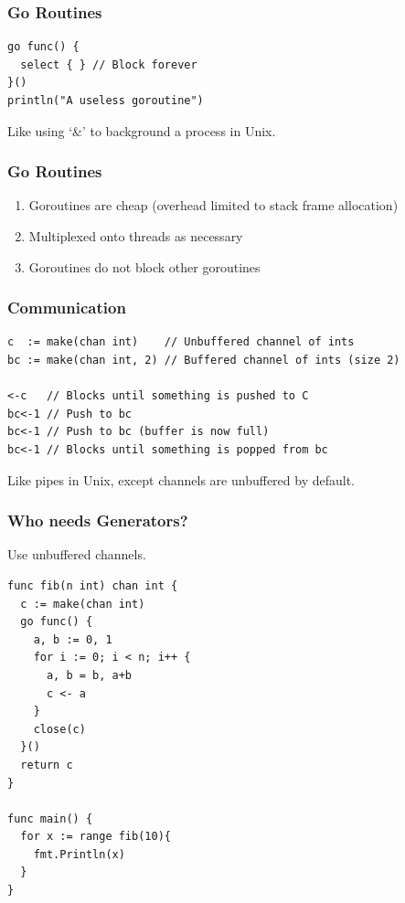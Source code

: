 \documentclass[xelatex,aspectratio=169]{beamer}
\begin{document}
\begin{frame}[fragile]
	\frametitle{Go Routines}
\begin{verbatim}
go func() {
  select { } // Block forever
}()
println("A useless goroutine")
\end{verbatim}
\begin{flushleft}
	Like using `\&' to background a process in Unix.
\end{flushleft}
\end{frame}

\begin{frame}
	\frametitle{Go Routines}
	\begin{enumerate}
		\item<1> Goroutines are cheap (overhead limited to stack frame allocation)
		\item<2> Multiplexed onto threads as necessary
		\item<3> Goroutines do not block other goroutines
	\end{enumerate}
\end{frame}

\begin{frame}[fragile]
	\frametitle{Communication}
\begin{verbatim}
c  := make(chan int)    // Unbuffered channel of ints
bc := make(chan int, 2) // Buffered channel of ints (size 2)

<-c   // Blocks until something is pushed to C
bc<-1 // Push to bc
bc<-1 // Push to bc (buffer is now full)
bc<-1 // Blocks until something is popped from bc
\end{verbatim}
\begin{flushleft}
	Like pipes in Unix, except channels are unbuffered by default.
\end{flushleft}
\end{frame}

\begin{frame}[fragile]
	\frametitle{Who needs Generators?}
	Use unbuffered channels.
\tiny
\begin{verbatim}
func fib(n int) chan int {
  c := make(chan int)
  go func() {
    a, b := 0, 1
    for i := 0; i < n; i++ {
      a, b = b, a+b
      c <- a
    }
    close(c)
  }()
  return c
}

func main() {
  for x := range fib(10){
    fmt.Println(x)
  }
}
\end{verbatim}
\end{frame}
\end{document}
